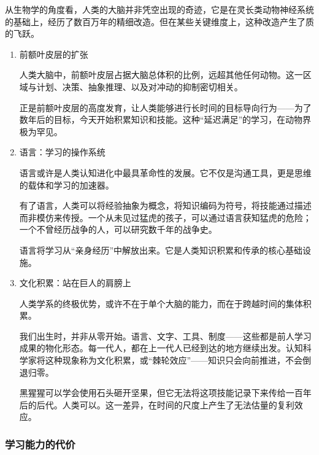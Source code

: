 \documentclass[11pt]{article}
\begin{document}
从生物学的角度看，人类的大脑并非凭空出现的奇迹，它是在灵长类动物神经系统的基础上，经历了数百万年的精细改造。但在某些关键维度上，这种改造产生了质的飞跃。
\begin{enumerate}
\item 前额叶皮层的扩张
\label{sec:orged4ffae}

人类大脑中，前额叶皮层占据大脑总体积的比例，远超其他任何动物。这一区域与计划、决策、抽象推理、以及对冲动的抑制密切相关。

正是前额叶皮层的高度发育，让人类能够进行长时间的目标导向行为——为了数年后的目标，今天开始积累知识和技能。这种“延迟满足”的学习，在动物界极为罕见。
\item 语言：学习的操作系统
\label{sec:org4cb81a7}

语言或许是人类认知进化中最具革命性的发展。它不仅是沟通工具，更是思维的载体和学习的加速器。

有了语言，人类可以将经验抽象为概念，将知识编码为符号，将技能通过描述而非模仿来传授。一个从未见过猛虎的孩子，可以通过语言获知猛虎的危险；一个不曾经历战争的人，可以研究数千年的战争史。

语言将学习从“亲身经历”中解放出来。它是人类知识积累和传承的核心基础设施。
\item 文化积累：站在巨人的肩膀上
\label{sec:orgb2fbf89}

人类学系的终极优势，或许不在于单个大脑的能力，而在于跨越时间的集体积累。

我们出生时，并非从零开始。语言、文字、工具、制度——这些都是前人学习成果的物化形态。每一代人，都在上一代人已经到达的地方继续出发。认知科学家将这种现象称为文化积累，或“棘轮效应”——知识只会向前推进，不会倒退归零。

黑猩猩可以学会使用石头砸开坚果，但它无法将这项技能记录下来传给一百年后的后代。人类可以。这一差异，在时间的尺度上产生了无法估量的复利效应。
\end{enumerate}
\subsubsection{学习能力的代价}
\label{sec:org9a4b52e}
\end{document}

